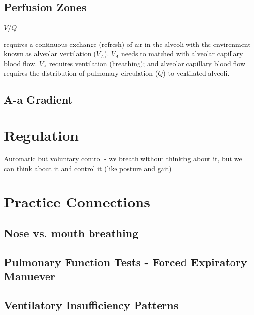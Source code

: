 \subsection{Perfusion Zones}
$\dot{V}/\dot{Q}$

requires a continuous exchange (refresh) of air in the alveoli with the environment known as alveolar ventilation ($V_A$). $V_A$ needs to matched with alveolar capillary blood flow. $V_A$ requires ventilation (breathing); and alveolar capillary blood flow requires the distribution of pulmonary circulation ($Q$) to ventilated alveoli. 


\subsection{A-a Gradient}


\section{Regulation}

Automatic but voluntary control - we breath without thinking about it, but we can think about it and control it (like posture and gait)



\section{Practice Connections}

\subsection{Nose vs. mouth breathing}

\subsection{Pulmonary Function Tests - Forced Expiratory Manuever}

\subsection{Ventilatory Insufficiency Patterns}

\printbibliography[heading=subbibintoc]